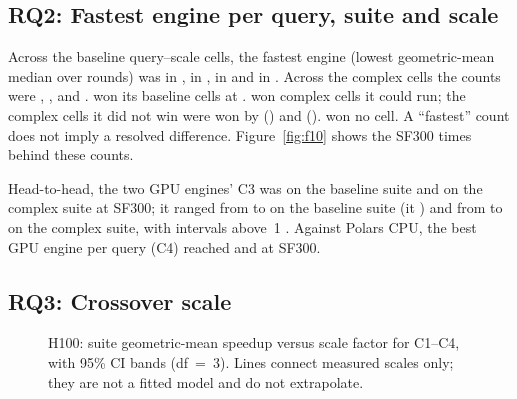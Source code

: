 \documentclass[sigconf, nonacm]{acmart}
\begin{document}
\subsection{RQ2: Fastest engine per query, suite and scale}
\label{sec:rq2}

Across the  baseline query--scale cells, the
fastest engine (lowest geometric-mean median over rounds) was \polarscpu{} in
, \polarsgpu{} in
, \sparkcpu{} in
 and \sparkgpu{} in
. Across the
 complex cells the counts were
, ,
 and
. \polarscpu{} won its baseline cells at
. \polarsgpu{} won
 complex cells it could run; the
complex cells it did not win were won by \sparkgpu{}
() and \polarscpu{}
(). \sparkcpu{} won no cell. A
``fastest'' count does not imply a resolved difference.
Figure~\ref{fig:f10} shows the SF300 times behind these counts.

Head-to-head, the two GPU engines' C3 was  on the
baseline suite and  on the complex suite at SF300;
it ranged from  to 
on the baseline suite (it ) and from
 to  on the complex
suite, with intervals above~1 . Against Polars CPU,
the best GPU engine per query (C4) reached  and
 at SF300.

\subsection{RQ3: Crossover scale}
\label{sec:rq3}

\begin{figure}[t]
\centering
{}
\caption{H100: suite geometric-mean speedup versus scale factor for C1--C4,
with 95\% CI bands (df~=~3). Lines connect measured scales only; they are not a
fitted model and do not extrapolate. \chartnote}
\label{fig:f2}
\end{figure}
\end{document}

